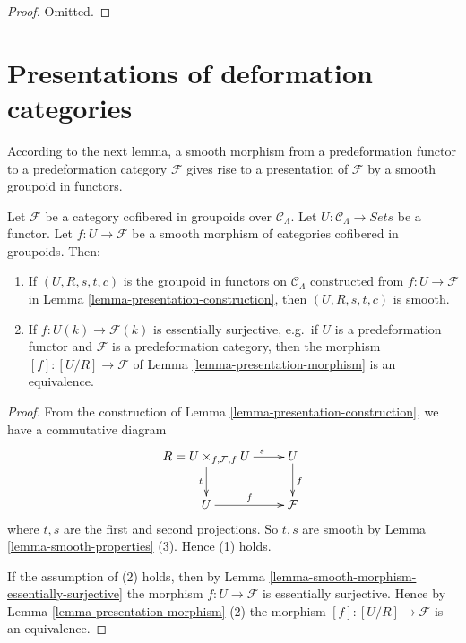 \begin{proof}
Omitted.
\end{proof}







\section{Presentations of deformation categories}
\label{section-presentation-deformation-categories}

\noindent
According to the next lemma, a smooth morphism from a predeformation functor to 
a predeformation category $\mathcal{F}$ gives rise to a presentation of 
$\mathcal{F}$ by a smooth groupoid in functors.

\begin{lemma}
\label{lemma-smooth-groupoid-in-functors-construction}
Let $\mathcal{F}$ be a category cofibered in groupoids over $\mathcal 
C_\Lambda$.  Let $U: \mathcal{C}_\Lambda \to \textit{Sets}$ be 
a functor.  Let $f: U \to \mathcal{F}$ be a smooth morphism of 
categories cofibered in groupoids. Then:
\begin{enumerate}
\item If $(U,R,s,t,c)$ is the groupoid in functors on $\mathcal{C}_\Lambda$ 
constructed from $f: U \to \mathcal{F}$ in Lemma 
\ref{lemma-presentation-construction}, then $(U,R,s,t,c)$ is smooth. 
\item If $f: U(k) \to \mathcal{F}(k)$ is essentially surjective, e.g.\ 
if $U$ is a predeformation functor and $\mathcal{F}$ is a predeformation 
category, then the morphism $[f]: [U/R] \to \mathcal{F}$ of Lemma 
\ref{lemma-presentation-morphism} is an equivalence.
\end{enumerate}
\end{lemma}

\begin{proof}
From the construction of Lemma \ref{lemma-presentation-construction}, we have a 
commutative diagram
\[
\xymatrix{
R = U \times_{f,\mathcal{F}, f} U \ar[r]^{\hspace{7mm} s} \ar[d]_{t} & U 
\ar[d]^{f} \\
U \ar[r]^{f} & \mathcal{F}
}
\]
where $t,s$ are the first and second projections.  So $t,s$ are smooth by Lemma 
\ref{lemma-smooth-properties} (3).  Hence (1) holds.

\medskip \noindent
If the assumption of (2) holds, then by Lemma 
\ref{lemma-smooth-morphism-essentially-surjective} the morphism $f: U 
\to \mathcal{F}$ is essentially surjective. Hence by Lemma 
\ref{lemma-presentation-morphism} (2) the morphism $[f]: [U/R] \to 
\mathcal{F}$ is an equivalence.
\end{proof}

